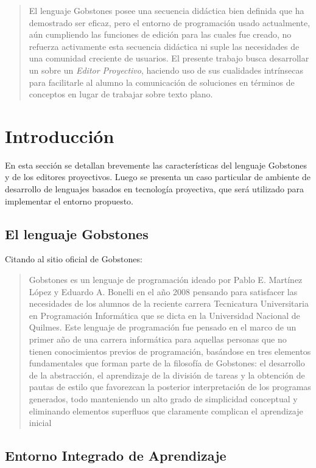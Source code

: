 \begin{abstract}
El lenguaje Gobstones posee una secuencia didáctica bien definida que ha demostrado ser eficaz, pero el entorno de programación usado actualmente, aún cumpliendo las funciones de edición para las cuales fue creado, no refuerza activamente esta secuencia didáctica ni suple las necesidades de una comunidad creciente de usuarios. El presente trabajo busca desarrollar un \ile sobre un \textit{Editor Proyectivo}, haciendo uso de sus cualidades intrínsecas para facilitarle al alumno la comunicación de soluciones en términos de conceptos en lugar de trabajar sobre texto plano.
\end{abstract}


\section{Introducción}

En esta sección se detallan brevemente las características del lenguaje Gobstones y de los editores proyectivos. Luego se presenta un caso particular de ambiente de desarrollo de lenguajes basados en tecnología proyectiva, que será utilizado para implementar el entorno propuesto.


\subsection{El lenguaje Gobstones}

Citando al sitio oficial de Gobstones\cite{Gobstones}:
\begin{quote}
Gobstones es un lenguaje de programación ideado por Pablo E. Martínez López y Eduardo A. Bonelli en el año 2008 pensando para satisfacer las necesidades de los alumnos de la reciente carrera Tecnicatura Universitaria en Programación Informática que se dicta en la Universidad Nacional de Quilmes. Este lenguaje de programación fue pensado en el marco de un primer año de una carrera informática para aquellas personas que no tienen conocimientos previos de programación, basándose en tres elementos fundamentales que forman parte de la filosofía de Gobstones: el desarrollo de la abstracción, el aprendizaje de la división de tareas y la obtención de pautas de estilo que favorezcan la posterior interpretación de los programas generados, todo manteniendo un alto grado de simplicidad conceptual y eliminando elementos superfluos que claramente complican el aprendizaje inicial
\end{quote}


\subsection{Entorno Integrado de Aprendizaje}

